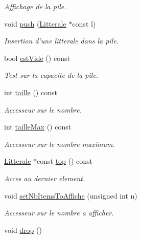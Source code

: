 \begin{CompactItemize}
\begin{CompactList}\small\item\em Affichage de la pile. \item\end{CompactList}\item 
void \hyperlink{class_pile_c61f214686f5c75fc71fc86ce8da53e0}{push} (\hyperlink{class_litterale}{Litterale} $\ast$const l)
\begin{CompactList}\small\item\em Insertion d'une litterale dans la pile. \item\end{CompactList}\item 
bool \hyperlink{class_pile_2ca7edab82a4b7a4305093dd9ab14d71}{estVide} () const 
\begin{CompactList}\small\item\em Test sur la capacite de la pile. \item\end{CompactList}\item 
int \hyperlink{class_pile_5d004688a405e8588c46336aa9cac0d9}{taille} () const 
\begin{CompactList}\small\item\em Accesseur sur le nombre. \item\end{CompactList}\item 
int \hyperlink{class_pile_b6c6dc3469f0ab644c5813f81f15b6dc}{tailleMax} () const 
\begin{CompactList}\small\item\em Accesseur sur le nombre maximum. \item\end{CompactList}\item 
\hyperlink{class_litterale}{Litterale} $\ast$const \hyperlink{class_pile_7e00e528aa0f5995a54941351659098f}{top} () const 
\begin{CompactList}\small\item\em Acces au dernier element. \item\end{CompactList}\item 
void \hyperlink{class_pile_a61a682bdd3b9dac5d1b25e481c453d1}{setNbItemsToAffiche} (unsigned int n)
\begin{CompactList}\small\item\em Accesseur sur le nombre a afficher. \item\end{CompactList}\item 
\hypertarget{class_pile_7488ed257c6ceb16ed57a9fffb0726d5}{
void \hyperlink{class_pile_7488ed257c6ceb16ed57a9fffb0726d5}{drop} ()}
\label{class_pile_7488ed257c6ceb16ed57a9fffb0726d5}


\end{CompactItemize}
